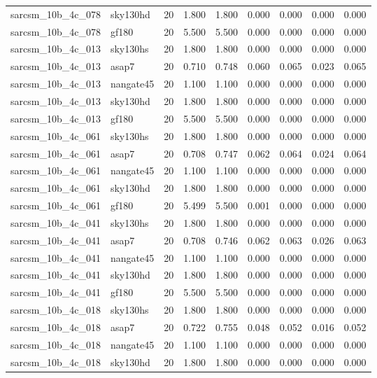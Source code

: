 \begin{tabular}{llrrrrrrr}
sarcsm\_10b\_4c\_078 & sky130hd & 20 & 1.800 & 1.800 & 0.000 & 0.000 & 0.000 & 0.000 \\
sarcsm\_10b\_4c\_078 & gf180 & 20 & 5.500 & 5.500 & 0.000 & 0.000 & 0.000 & 0.000 \\
sarcsm\_10b\_4c\_013 & sky130hs & 20 & 1.800 & 1.800 & 0.000 & 0.000 & 0.000 & 0.000 \\
sarcsm\_10b\_4c\_013 & asap7 & 20 & 0.710 & 0.748 & 0.060 & 0.065 & 0.023 & 0.065 \\
sarcsm\_10b\_4c\_013 & nangate45 & 20 & 1.100 & 1.100 & 0.000 & 0.000 & 0.000 & 0.000 \\
sarcsm\_10b\_4c\_013 & sky130hd & 20 & 1.800 & 1.800 & 0.000 & 0.000 & 0.000 & 0.000 \\
sarcsm\_10b\_4c\_013 & gf180 & 20 & 5.500 & 5.500 & 0.000 & 0.000 & 0.000 & 0.000 \\
sarcsm\_10b\_4c\_061 & sky130hs & 20 & 1.800 & 1.800 & 0.000 & 0.000 & 0.000 & 0.000 \\
sarcsm\_10b\_4c\_061 & asap7 & 20 & 0.708 & 0.747 & 0.062 & 0.064 & 0.024 & 0.064 \\
sarcsm\_10b\_4c\_061 & nangate45 & 20 & 1.100 & 1.100 & 0.000 & 0.000 & 0.000 & 0.000 \\
sarcsm\_10b\_4c\_061 & sky130hd & 20 & 1.800 & 1.800 & 0.000 & 0.000 & 0.000 & 0.000 \\
sarcsm\_10b\_4c\_061 & gf180 & 20 & 5.499 & 5.500 & 0.001 & 0.000 & 0.000 & 0.000 \\
sarcsm\_10b\_4c\_041 & sky130hs & 20 & 1.800 & 1.800 & 0.000 & 0.000 & 0.000 & 0.000 \\
sarcsm\_10b\_4c\_041 & asap7 & 20 & 0.708 & 0.746 & 0.062 & 0.063 & 0.026 & 0.063 \\
sarcsm\_10b\_4c\_041 & nangate45 & 20 & 1.100 & 1.100 & 0.000 & 0.000 & 0.000 & 0.000 \\
sarcsm\_10b\_4c\_041 & sky130hd & 20 & 1.800 & 1.800 & 0.000 & 0.000 & 0.000 & 0.000 \\
sarcsm\_10b\_4c\_041 & gf180 & 20 & 5.500 & 5.500 & 0.000 & 0.000 & 0.000 & 0.000 \\
sarcsm\_10b\_4c\_018 & sky130hs & 20 & 1.800 & 1.800 & 0.000 & 0.000 & 0.000 & 0.000 \\
sarcsm\_10b\_4c\_018 & asap7 & 20 & 0.722 & 0.755 & 0.048 & 0.052 & 0.016 & 0.052 \\
sarcsm\_10b\_4c\_018 & nangate45 & 20 & 1.100 & 1.100 & 0.000 & 0.000 & 0.000 & 0.000 \\
sarcsm\_10b\_4c\_018 & sky130hd & 20 & 1.800 & 1.800 & 0.000 & 0.000 & 0.000 & 0.000 \\

\end{tabular}
